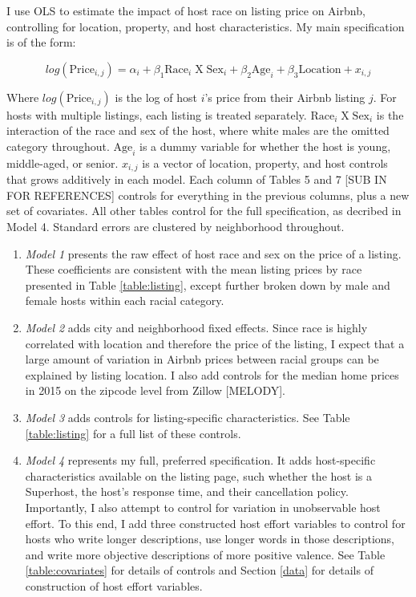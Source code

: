 \label{empirical}

I use OLS to estimate the impact of host race on listing price on Airbnb, controlling for location, property, and host characteristics. My main specification is of the form:

\[ log(\text{Price}_{i,j}) = \alpha_i + \beta_1 \text{Race}_{i} \;  \text{X} \; \text{Sex}_i + \beta_2 \text{Age}_i + \beta_3 \text{Location} +  x_{i,j} \]

Where $log(\text{Price}_{i,j})$ is the log of host $i$'s price from their Airbnb listing $j$. For hosts with multiple listings, each listing is treated separately. $\text{Race}_{i} \;  \text{X} \; \text{Sex}_i$ is the interaction of the race and sex of the host, where white males are the omitted category throughout. $\text{Age}_i$ is a dummy variable for whether the host is young, middle-aged, or senior. $x_{i,j}$ is a vector of location, property, and host controls that grows additively in each model. Each column of Tables 5 and 7 [SUB IN FOR REFERENCES] controls for everything in the previous columns, plus a new set of covariates. All other tables control for the full specification, as decribed in Model 4. Standard errors are clustered by neighborhood throughout.

\begin{enumerate}
	\item \textit{Model 1} presents the raw effect of host race and sex on the price of a listing. These coefficients are consistent with the mean listing prices by race presented in Table \ref{table:listing}, except further broken down by male and female hosts within each racial category.
	
	\item \textit{Model 2} adds city and neighborhood fixed effects. Since race is highly correlated with location and therefore the price of the listing, I expect that a large amount of variation in Airbnb prices between racial groups can be explained by listing location. I also add controls for the median home prices in 2015 on the zipcode level from Zillow [MELODY].  
	
	\item \textit{Model 3} adds controls for listing-specific characteristics. See Table \ref{table:listing} for a full list of these controls. 
	
	\item \textit{Model 4} represents my full, preferred specification. It adds host-specific characteristics available on the listing page, such whether the host is a Superhost, the host's response time, and their cancellation policy. Importantly, I also attempt to control for variation in unobservable host effort. To this end, I add three constructed host effort variables to control for hosts who write longer descriptions, use longer words in those descriptions, and write more objective descriptions of more positive valence. See Table \ref{table:covariates} for details of controls and Section \ref{data} for details of construction of host effort variables. 
\end{enumerate}




